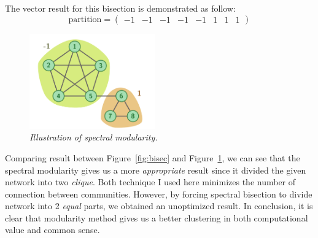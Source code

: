 \documentclass[a4paper,12pt]{article}
\begin{document}
\noindent
The vector result for this bisection is demonstrated as follow:
\[ \mbox{partition} = \left( \begin{array}{cccccccc} -1 & -1 & -1 & -1 & -1 & 1 & 1 & 1 \end{array} \right) \]

\begin{figure}
    \vspace{-2em}
    \centering
      \includegraphics[width=0.48\textwidth]{cn_a2_modul}
    \vspace{-1em}
    \caption{\emph{Illustration of spectral modularity.}}
    \label{fig:modul}
    \vspace{-1em}
\end{figure}

\noindent
Comparing result between Figure~\ref{fig:bisec} and Figure~\ref{fig:modul}, we can see that the spectral modularity gives us a more \emph{appropriate} result since it divided the given network into two \emph{clique}. Both technique I used here minimizes the number of connection between communities. However, by forcing spectral bisection to divide network into 2 \emph{equal} parts, we obtained an unoptimized result. In conclusion, it is clear that modularity method gives us a better clustering in both computational value and common sense.
\end{document}
